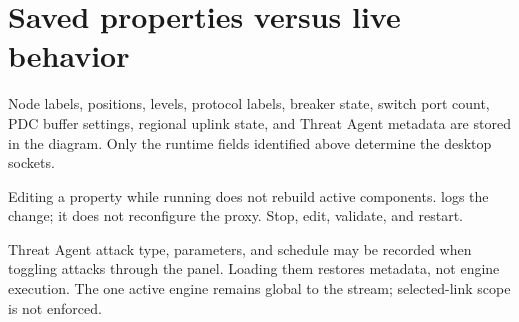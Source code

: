 \section*{Saved properties versus live behavior}
Node labels, positions, levels, protocol labels, breaker state, switch port count, PDC buffer settings, regional uplink state, and Threat Agent metadata are stored in the diagram. Only the runtime fields identified above determine the desktop sockets.

Editing a property while running does not rebuild active components.  logs the change; it does not reconfigure the proxy. Stop, edit, validate, and restart.

Threat Agent attack type, parameters, and schedule may be recorded when toggling attacks through the panel. Loading them restores metadata, not engine execution. The one active engine remains global to the stream; selected-link scope is not enforced.

